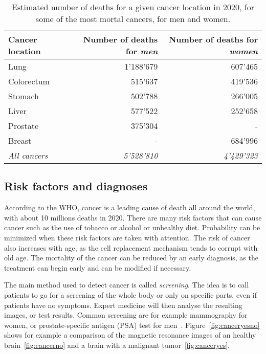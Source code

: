 \begin{table}[t]
  \begin{tabular}[t]{lrr}\toprule
    Cancer location & Number of deaths for \emph{men} & Number of deaths for \emph{women} \\\midrule
    Lung & 1'188'679 & 607'465 \\
    Colorectum & 515'637 & 419'536 \\
    Stomach & 502'788 & 266'005\\
    Liver & 577'522 & 252'658\\
    Prostate & 375'304 & - \\
    Breast & - & 684'996 \\
    \emph{All cancers} & \emph{5'528'810} & \emph{4'429'323} \\\bottomrule
  \end{tabular}
  \caption{Estimated number of deaths for a given cancer location in 2020, for some of the most mortal cancers, for men and women.}
  \label{tab:cancer}
\end{table}


\subsection{Risk factors and diagnoses}
According to the WHO, cancer is a leading cause of death all around the world, with about 10 millions deaths in 2020. There are many risk factors that can cause cancer such as the use of tobacco or alcohol or unhealthy diet. Probability can be minimized when these risk factors are taken with attention. The risk of cancer also increases with age, as the cell replacement mechanism tends to corrupt with old age. The mortality of the cancer can be reduced by an early diagnosis, as the treatment can begin early and can be modified if necessary.

The main method used to detect cancer is called \emph{screening}. The idea is to call patients to go for a screening of the whole body or only on specific parts, even if patients have no symptoms. Expert medicine will then analyse the resulting images, or test results. Common screening are for example mammography for women, or prostate-specific antigen (PSA) test for men~\cite{world_health_organization_cancer_nodate}. Figure~\ref{fig:canceryesno} shows for example a comparison of the magnetic resonance images of an healthy brain~\ref{fig:cancerno} and a brain with a malignant tumor~\ref{fig:canceryes}.

